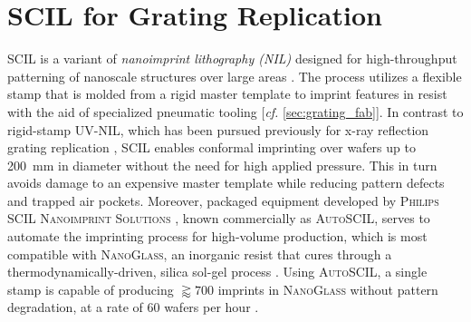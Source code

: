 \section{SCIL for Grating Replication}\label{sec:SCIL_ch5}
SCIL is a variant of \emph{nanoimprint lithography (NIL)} designed for high-throughput patterning of nanoscale structures over large areas \cite{Verschuuren10,Verschuuren17}. 
The process utilizes a flexible stamp that is molded from a rigid master template to imprint features in resist with the aid of specialized pneumatic tooling [\emph{cf.\@} \cref{sec:grating_fab}]. 
In contrast to rigid-stamp UV-NIL, which has been pursued previously for x-ray reflection grating replication \cite[\emph{cf.\@} \cref{sec:nanoimprint}]{Chang03,Chang04,McEntaffer13,DeRoo16,Miles18}, SCIL enables conformal imprinting over wafers up to \SI{200}{\mm} in diameter without the need for high applied pressure. 
This in turn avoids damage to an expensive master template while reducing pattern defects and trapped air pockets. %
Moreover, packaged equipment developed by \textsc{Philips SCIL Nanoimprint Solutions} \cite{philis_scil}, known commercially as \textsc{AutoSCIL}, serves to automate the imprinting process for high-volume production, which is most compatible with \textsc{NanoGlass}, an inorganic resist that cures through a thermodynamically-driven, silica sol-gel process \cite{Verschuuren10,Verschuuren17,Verschuuren19}. 
Using \textsc{AutoSCIL}, a single stamp is capable of producing $\gtrapprox \num{700}$ imprints in \textsc{NanoGlass} without pattern degradation, at a rate of \num{60} wafers per hour \cite{Verschuuren17,Verschuuren18}. 

